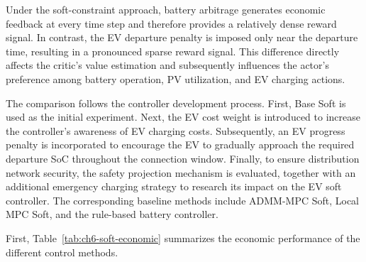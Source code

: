 Under the soft-constraint approach, battery arbitrage generates economic feedback at every time step and therefore provides a relatively dense reward signal. In contrast, the EV departure penalty is imposed only near the departure time, resulting in a pronounced sparse reward signal. This difference directly affects the critic's value estimation and subsequently influences the actor's preference among battery operation, PV utilization, and EV charging actions.

The comparison follows the controller development process. First, Base Soft is used as the initial experiment. Next, the EV cost weight is introduced to increase the controller's awareness of EV charging costs. Subsequently, an EV progress penalty is incorporated to encourage the EV to gradually approach the required departure SoC throughout the connection window. Finally, to ensure distribution network security, the safety projection mechanism is evaluated, together with an additional emergency charging strategy to research its impact on the EV soft controller. The corresponding baseline methods include ADMM-MPC Soft, Local MPC Soft, and the rule-based battery controller.

First, Table~\ref{tab:ch6-soft-economic} summarizes the economic performance of the different control methods.

\begin{table}[htbp]
  \centering
  \caption{Economic Performance Comparison of Different EV Soft Constraint Controllers and Baseline Methods}
  \label{tab:ch6-soft-economic}
\end{table}

